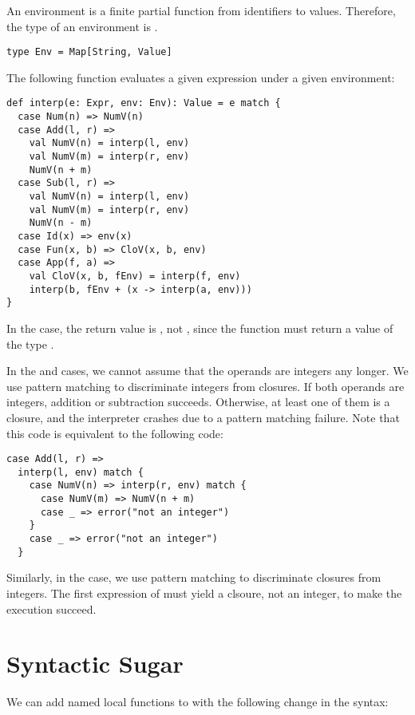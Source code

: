 An environment is a finite partial function from identifiers to values.
Therefore, the type of an environment is .

\begin{verbatim}
type Env = Map[String, Value]
\end{verbatim}

The following function evaluates a given expression under a given environment:

\begin{verbatim}
def interp(e: Expr, env: Env): Value = e match {
  case Num(n) => NumV(n)
  case Add(l, r) =>
    val NumV(n) = interp(l, env)
    val NumV(m) = interp(r, env)
    NumV(n + m)
  case Sub(l, r) =>
    val NumV(n) = interp(l, env)
    val NumV(m) = interp(r, env)
    NumV(n - m)
  case Id(x) => env(x)
  case Fun(x, b) => CloV(x, b, env)
  case App(f, a) =>
    val CloV(x, b, fEnv) = interp(f, env)
    interp(b, fEnv + (x -> interp(a, env)))
}
\end{verbatim}

In the  case, the return value is , not ,
since the function must return a value of the type .

In the
 and  cases, we cannot assume that the operands are integers
any longer. We use pattern matching to discriminate integers from closures. If
both operands are integers, addition or subtraction succeeds. Otherwise, at
least one of them is a closure, and the interpreter crashes due to a pattern
matching failure. Note that this code is equivalent to the following code:

\begin{verbatim}
case Add(l, r) =>
  interp(l, env) match {
    case NumV(n) => interp(r, env) match {
      case NumV(m) => NumV(n + m)
      case _ => error("not an integer")
    }
    case _ => error("not an integer")
  }
\end{verbatim}

Similarly, in the  case, we use pattern matching to discriminate
closures from integers. The first expression of  must yield a clsoure,
not an integer, to make the execution succeed.

\section{Syntactic Sugar}

We can add named local functions to \lang with the following change in the
syntax:


